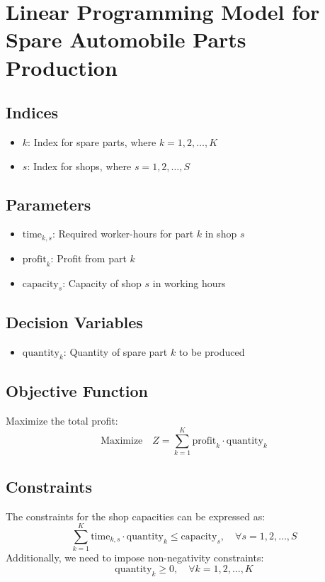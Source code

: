 \documentclass{article}
\begin{document}
\section*{Linear Programming Model for Spare Automobile Parts Production}

\subsection*{Indices}
\begin{itemize}
    \item \( k \): Index for spare parts, where \( k = 1, 2, \ldots, K \)
    \item \( s \): Index for shops, where \( s = 1, 2, \ldots, S \)
\end{itemize}

\subsection*{Parameters}
\begin{itemize}
    \item \( \text{time}_{k,s} \): Required worker-hours for part \( k \) in shop \( s \)
    \item \( \text{profit}_{k} \): Profit from part \( k \)
    \item \( \text{capacity}_{s} \): Capacity of shop \( s \) in working hours
\end{itemize}

\subsection*{Decision Variables}
\begin{itemize}
    \item \( \text{quantity}_{k} \): Quantity of spare part \( k \) to be produced
\end{itemize}

\subsection*{Objective Function}
Maximize the total profit:
\[
\text{Maximize} \quad Z = \sum_{k=1}^{K} \text{profit}_{k} \cdot \text{quantity}_{k}
\]

\subsection*{Constraints}
The constraints for the shop capacities can be expressed as:
\[
\sum_{k=1}^{K} \text{time}_{k,s} \cdot \text{quantity}_{k} \leq \text{capacity}_{s}, \quad \forall s = 1, 2, \ldots, S
\]
Additionally, we need to impose non-negativity constraints:
\[
\text{quantity}_{k} \geq 0, \quad \forall k = 1, 2, \ldots, K
\]
\end{document}
